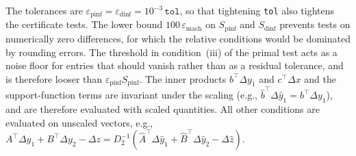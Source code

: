 The tolerances are $\varepsilon_{\mathrm{pinf}} = \varepsilon_{\mathrm{dinf}} = 10^{-3}\,\texttt{tol}$, so that tightening \texttt{tol} also tightens the certificate tests. The lower bound $100\,\varepsilon_{\mathrm{mach}}$ on $S_{\mathrm{pinf}}$ and $S_{\mathrm{dinf}}$ prevents tests on numerically zero differences, for which the relative conditions would be dominated by rounding errors. The threshold in condition~(iii) of the primal test acts as a noise floor for entries that should vanish rather than as a residual tolerance, and is therefore looser than $\varepsilon_{\mathrm{pinf}} S_{\mathrm{pinf}}$. The inner products $b^\top \Delta y_1$ and $c^\top \Delta x$ and the support-function terms are invariant under the scaling (e.g., $\hat{b}^\top \Delta \hat{y}_1 = b^\top \Delta y_1$), and are therefore evaluated with scaled quantities. All other conditions are evaluated on unscaled vectors, e.g., $A^\top \Delta y_1 + B^\top \Delta y_2 - \Delta z = D_2^{-1}(\hat{A}^\top \Delta\hat{y}_1 + \hat{B}^\top \Delta\hat{y}_2 - \Delta\hat{z})$.

